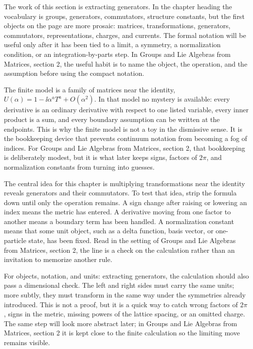 The work of this section is extracting generators.  In the chapter heading the vocabulary is groups, generators, commutators, structure constants, but the first objects on the page are more prosaic: matrices, transformations, generators, commutators, representations, charges, and currents.  The formal notation will be useful only after it has been tied to a limit, a symmetry, a normalization condition, or an integration-by-parts step.  In Groups and Lie Algebras from Matrices, section 2, the useful habit is to name the object, the operation, and the assumption before using the compact notation.

The finite model is a family of matrices near the identity, \(U(\alpha)=1-\ii\alpha^aT^a+O(\alpha^2)\).  In that model no mystery is available: every derivative is an ordinary derivative with respect to one listed variable, every inner product is a sum, and every boundary assumption can be written at the endpoints.  This is why the finite model is not a toy in the dismissive sense.  It is the bookkeeping device that prevents continuum notation from becoming a fog of indices.  For Groups and Lie Algebras from Matrices, section 2, that bookkeeping is deliberately modest, but it is what later keeps signs, factors of \(2\pi\), and normalization constants from turning into guesses.

The central idea for this chapter is multiplying transformations near the identity reveals generators and their commutators.  To test that idea, strip the formula down until only the operation remains.  A sign change after raising or lowering an index means the metric has entered.  A derivative moving from one factor to another means a boundary term has been handled.  A normalization constant means that some unit object, such as a delta function, basis vector, or one-particle state, has been fixed.  Read in the setting of Groups and Lie Algebras from Matrices, section 2, the line is a check on the calculation rather than an invitation to memorize another rule.

For objects, notation, and units: extracting generators, the calculation should also pass a dimensional check.  The left and right sides must carry the same units; more subtly, they must transform in the same way under the symmetries already introduced.  This is not a proof, but it is a quick way to catch wrong factors of \(2\pi\), signs in the metric, missing powers of the lattice spacing, or an omitted charge.  The same step will look more abstract later; in Groups and Lie Algebras from Matrices, section 2 it is kept close to the finite calculation so the limiting move remains visible.

